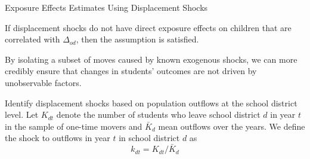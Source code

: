 \documentclass[aspectratio=169,xcolor=dvipsnames]{beamer}
\newenvironment{wideitemize}{\itemize\addtolength{\itemsep}{10pt}}{\enditemize}
\begin{document}


    

\begin{frame}{Exposure Effects Estimates Using Displacement Shocks}
\begin{wideitemize}
    \item If displacement shocks do not have direct exposure effects on children that are correlated with $\Delta_{od}$, then the assumption is satisfied. 
    \item By isolating a subset of moves caused by known exogenous shocks, we can more credibly ensure that changes in students’ outcomes are not driven by unobservable factors.
    \item Identify displacement shocks based on population outflows at the school district level. Let $K_{dt}$ denote the number of students who leave school district $d$ in year $t$ in the sample of one-time movers and $\bar{K}_d$ mean outflows over the years. We define the shock to outflows in year $t$ in school district $d$ as 
    $$k_{dt} = K_{dt}/\bar{K}_d$$
\end{wideitemize}

\end{frame}
\end{document}
